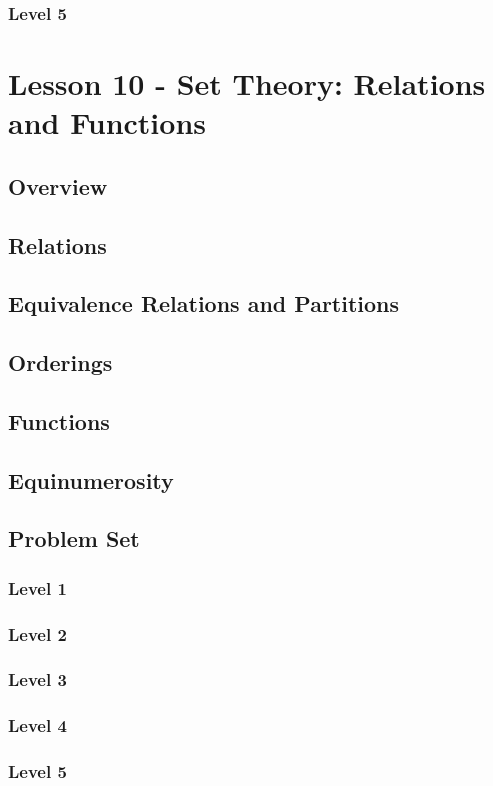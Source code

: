 \documentclass{article}
\begin{document}
\subsubsection{Level 5}
\pagebreak

\section{Lesson 10 - Set Theory: Relations and Functions}
\subsection{Overview}
\subsection{Relations}
\subsection{Equivalence Relations and Partitions}
\subsection{Orderings}
\subsection{Functions}
\subsection{Equinumerosity}
\subsection{Problem Set}
\subsubsection{Level 1}
\subsubsection{Level 2}
\subsubsection{Level 3}
\subsubsection{Level 4}
\subsubsection{Level 5}
\pagebreak
\end{document}
